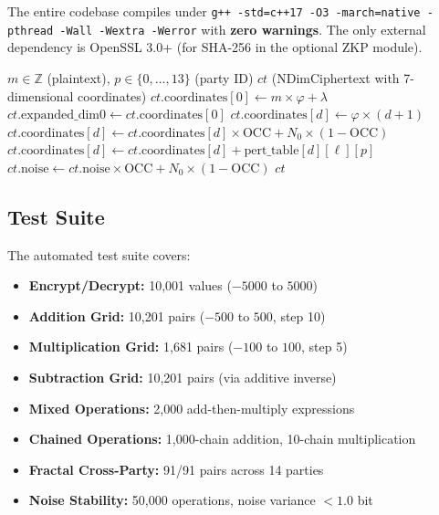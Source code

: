 \documentclass[11pt,a4paper]{article}
\begin{document}
The entire codebase compiles under \texttt{g++ -std=c++17 -O3 -march=native -pthread -Wall -Wextra -Werror} with \textbf{zero warnings}. The only external dependency is OpenSSL 3.0+ (for SHA-256 in the optional ZKP module).

\begin{algorithm}
\caption{Encryption: 7D Banach Forward Pass}
\label{alg:encrypt}
\begin{algorithmic}[1]
\Require $m \in \mathbb{Z}$ (plaintext), $p \in \{0,\ldots,13\}$ (party ID)
\Ensure $ct$ (NDimCiphertext with 7-dimensional coordinates)
\State $ct.\text{coordinates}[0] \gets m \times \varphi + \lambda$
\State $ct.\text{expanded\_dim0} \gets ct.\text{coordinates}[0]$ 
    \State $ct.\text{coordinates}[d] \gets \varphi \times (d+1)$
\EndFor
{} 
     
        \State $ct.\text{coordinates}[d] \gets ct.\text{coordinates}[d] \times \text{OCC} + N_0 \times (1 - \text{OCC})$
        \State $ct.\text{coordinates}[d] \gets ct.\text{coordinates}[d] + \text{pert\_table}[d][\ell][p]$
    \EndFor
    \State $ct.\text{noise} \gets ct.\text{noise} \times \text{OCC} + N_0 \times (1 - \text{OCC})$
\EndFor
\State \Return $ct$
\end{algorithmic}
\end{algorithm}

\subsection{Test Suite}

The automated test suite covers:
\begin{itemize}
    \item \textbf{Encrypt/Decrypt:} 10,001 values ($-5000$ to $5000$)
    \item \textbf{Addition Grid:} 10,201 pairs ($-500$ to $500$, step 10)
    \item \textbf{Multiplication Grid:} 1,681 pairs ($-100$ to $100$, step 5)
    \item \textbf{Subtraction Grid:} 10,201 pairs (via additive inverse)
    \item \textbf{Mixed Operations:} 2,000 add-then-multiply expressions
    \item \textbf{Chained Operations:} 1,000-chain addition, 10-chain multiplication
    \item \textbf{Fractal Cross-Party:} 91/91 pairs across 14 parties
    \item \textbf{Noise Stability:} 50,000 operations, noise variance $< 1.0$ bit
\end{itemize}
\end{document}
